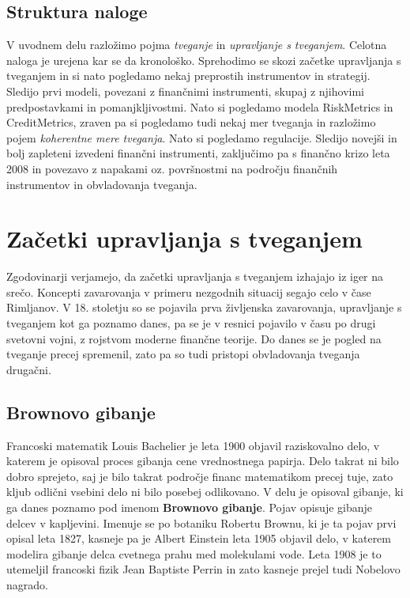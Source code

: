 \documentclass[12pt,a4paper]{amsart}
\theoremstyle{definition} %
\theoremstyle{plain} %
\begin{document}
\subsection{Struktura naloge}
V uvodnem delu razložimo pojma \textit{tveganje} in \textit{upravljanje s tveganjem}. Celotna 
naloga je urejena kar se da kronološko. Sprehodimo se skozi začetke upravljanja s tveganjem in
si nato pogledamo nekaj preprostih instrumentov in strategij. Sledijo prvi modeli, povezani z 
finančnimi instrumenti, skupaj z njihovimi predpostavkami in pomanjkljivostmi. Nato si pogledamo 
modela RiskMetrics in CreditMetrics, zraven pa si pogledamo tudi nekaj mer tveganja in razložimo 
pojem \textit{koherentne mere tveganja}. Nato si pogledamo regulacije. Sledijo novejši in bolj 
zapleteni izvedeni finančni instrumenti, zaključimo pa s finančno krizo leta 2008 in povezavo z 
napakami oz. površnostmi na področju finančnih instrumentov in obvladovanja tveganja.

\section{Začetki upravljanja s tveganjem}
Zgodovinarji verjamejo, da začetki upravljanja s tveganjem izhajajo iz iger na srečo. Koncepti
zavarovanja v primeru nezgodnih situacij segajo celo v čase Rimljanov. V 18. stoletju so se pojavila 
prva življenska zavarovanja, upravljanje s tveganjem kot ga poznamo danes, pa se je v resnici 
pojavilo v času po drugi svetovni vojni, z rojstvom moderne finančne teorije. Do danes se je 
pogled na tveganje precej spremenil, zato pa so tudi pristopi obvladovanja tveganja drugačni.

\subsection{Brownovo gibanje}
Francoski matematik Louis Bachelier je leta 1900 objavil raziskovalno delo, v katerem je opisoval 
proces gibanja cene vrednostnega papirja. Delo takrat ni bilo dobro 
sprejeto, saj je bilo takrat področje financ matematikom precej tuje, zato kljub odlični vsebini 
delo ni bilo posebej odlikovano. V delu je opisoval gibanje, ki ga danes poznamo 
pod imenom \textbf{Brownovo gibanje}. Pojav opisuje gibanje delcev v kapljevini. Imenuje se po botaniku
Robertu Brownu, ki je ta pojav prvi opisal leta 1827, kasneje pa je Albert Einstein leta 1905 
objavil delo, v katerem modelira gibanje delca cvetnega prahu med molekulami vode. Leta 1908
je to utemeljil francoski fizik Jean Baptiste Perrin in zato kasneje prejel tudi Nobelovo nagrado.
\end{document}
